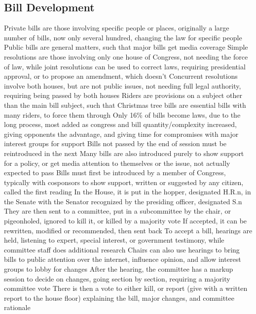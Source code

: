 \documentclass[11 pt, twoside]{article}
\newenvironment{outline*}
{
	\begin{outline}[enumerate]
	}
	{\end{outline}
}
\begin{document}
\subsection{Bill Development}
\begin{outline*}
\1 Private bills are those involving specific people or places, originally a large number of bills, now only several hundred, changing the law for specific people
\2 Public bills are general matters, such that major bills get media coverage
\1 Simple resolutions are those involving only one house of Congress, not needing the force of law, while joint resolutions can be used to correct laws, requiring presidential approval, or to propose an amendment, which doesn’t
\2 Concurrent resolutions involve both houses, but are not public issues, not needing full legal authority, requiring being passed by both houses
\1 Riders are provisions on a subject other than the main bill subject, such that Christmas tree bills are essential bills with many riders, to force them through
\1 Only 16\% of bills become laws, due to the long process, most added as congress and bill quantity/complexity increased, giving opponents the advantage, and giving time for compromises with major interest groups for support
\2 Bills not passed by the end of session must be reintroduced in the next
\2 Many bills are also introduced purely to show support for a policy, or get media attention to themselves or the issue, not actually expected to pass
\1 Bills must first be introduced by a member of Congress, typically with cosponsors to show support, written or suggested by any citizen, called the first reading
\2 In the House, it is put in the hopper, designated H.R.n, in the Senate with the Senator recognized by the presiding officer, designated S.n
\1 They are then sent to a committee, put in a subcommittee by the chair, or pigeonholed, ignored to kill it, or killed by a majority vote
\2 If accepted, it can be rewritten, modified or recommended, then sent back
\2 To accept a bill, hearings are held, listening to expert, special interest, or government testimony, while committee staff does additional research
\2 Chairs can also use hearings to bring bills to public attention over the internet, influence opinion, and allow interest groups to lobby for changes
\2 After the hearing, the committee has a markup session to decide on changes, going section by section, requiring a majority committee vote
\2 There is then a vote to either kill, or report (give with a written report to the house floor) explaining the bill, major changes, and committee rationale

\end{outline*}
\end{document}
